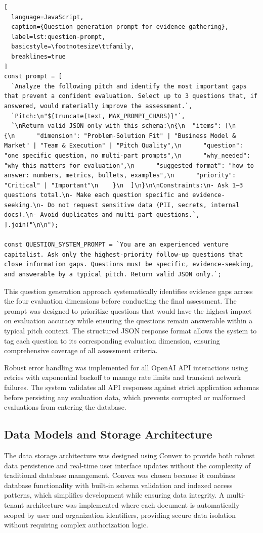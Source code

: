 \begin{lstlisting}[
  language=JavaScript,
  caption={Question generation prompt for evidence gathering},
  label=lst:question-prompt,
  basicstyle=\footnotesize\ttfamily,
  breaklines=true
]
const prompt = [
  `Analyze the following pitch and identify the most important gaps that prevent a confident evaluation. Select up to 3 questions that, if answered, would materially improve the assessment.`,
  `Pitch:\n"${truncate(text, MAX_PROMPT_CHARS)}"`,
  `\nReturn valid JSON only with this schema:\n{\n  "items": [\n    {\n      "dimension": "Problem-Solution Fit" | "Business Model & Market" | "Team & Execution" | "Pitch Quality",\n      "question": "one specific question, no multi-part prompts",\n      "why_needed": "why this matters for evaluation",\n      "suggested_format": "how to answer: numbers, metrics, bullets, examples",\n      "priority": "Critical" | "Important"\n    }\n  ]\n}\n\nConstraints:\n- Ask 1–3 questions total.\n- Make each question specific and evidence-seeking.\n- Do not request sensitive data (PII, secrets, internal docs).\n- Avoid duplicates and multi-part questions.`,
].join("\n\n");

const QUESTION_SYSTEM_PROMPT = `You are an experienced venture capitalist. Ask only the highest-priority follow-up questions that close information gaps. Questions must be specific, evidence-seeking, and answerable by a typical pitch. Return valid JSON only.`;
\end{lstlisting}

This question generation approach systematically identifies evidence gaps across the four evaluation dimensions before conducting the final assessment. The prompt was designed to prioritize questions that would have the highest impact on evaluation accuracy while ensuring the questions remain answerable within a typical pitch context. The structured JSON response format allows the system to tag each question to its corresponding evaluation dimension, ensuring comprehensive coverage of all assessment criteria.

Robust error handling was implemented for all OpenAI API interactions using retries with exponential backoff to manage rate limits and transient network failures. The system validates all API responses against strict application schemas before persisting any evaluation data, which prevents corrupted or malformed evaluations from entering the database.

\subsection{Data Models and Storage Architecture}\label{subsec:data-models-and-storage-architecture}
The data storage architecture was designed using Convex to provide both robust data persistence and real-time user interface updates without the complexity of traditional database management. Convex was chosen because it combines database functionality with built-in schema validation and indexed access patterns, which simplifies development while ensuring data integrity. A multi-tenant architecture was implemented where each document is automatically scoped by user and organization identifiers, providing secure data isolation without requiring complex authorization logic.

